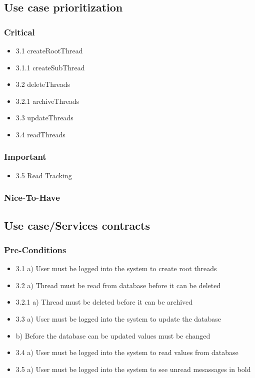 \documentclass[hidelinks, 12pt, oneside]{article}
\begin{document}
\subsection{Use case prioritization}
\subsubsection{Critical}
\begin{itemize}
  \item 3.1 createRootThread
  \item 3.1.1 createSubThread
  \item 3.2 deleteThreads
  \item 3.2.1 archiveThreads
  \item 3.3 updateThreads
  \item 3.4 readThreads
\end{itemize}
\subsubsection{Important}
 \begin{itemize}
  \item 3.5 Read Tracking
 \end{itemize}

\subsubsection{Nice-To-Have}


\subsection{Use case/Services contracts}
\subsubsection{Pre-Conditions}								%
\begin{itemize}
  \item 3.1 a) User must be logged into the system to create root threads
  \item 3.2 a) Thread must be read from database before it can be deleted
  \item 3.2.1 a) Thread must be deleted before it can be archived
  \item 3.3 a) User must be logged into the system to update the database
  \item     b) Before the database can be updated values must be changed
  \item 3.4 a) User must be logged into the system to read values from database
  \item 3.5 a) User must be logged into the system to see unread mesassages in bold
\end{itemize}
\end{document}
